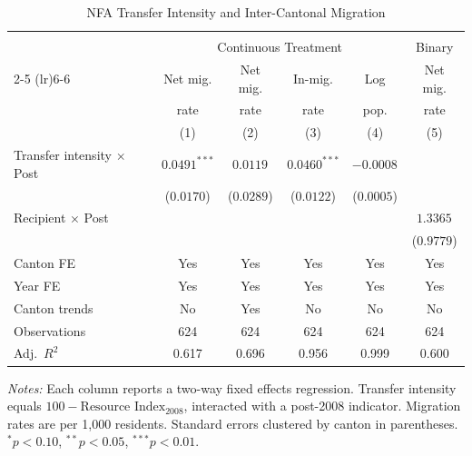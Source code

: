 \begin{table}[t]
\centering
\caption{NFA Transfer Intensity and Inter-Cantonal Migration}
\label{tab:main}
\small
\begin{threeparttable}
\begin{tabular}{lccccc}
\hline\hline
\\[-1.8ex]
 & \multicolumn{4}{c}{Continuous Treatment} & Binary \\
\cmidrule(lr){2-5} \cmidrule(lr){6-6}
 & Net mig. & Net mig. & In-mig. & Log & Net mig. \\
 & rate & rate & rate & pop. & rate \\
 & (1) & (2) & (3) & (4) & (5) \\
\hline
Transfer intensity $\times$ Post & $0.0491^{***}$ & $0.0119^{}$ & $0.0460^{***}$ & $-0.0008^{}$ & \\
 & ($0.0170$) & ($0.0289$) & ($0.0122$) & ($0.0005$) & \\
Recipient $\times$ Post & & & & & $1.3365^{}$ \\
 & & & & & ($0.9779$) \\
\hline
Canton FE & Yes & Yes & Yes & Yes & Yes \\
Year FE & Yes & Yes & Yes & Yes & Yes \\
Canton trends & No & Yes & No & No & No \\
Observations & 624 & 624 & 624 & 624 & 624 \\
Adj.\ $R^2$ & 0.617 & 0.696 & 0.956 & 0.999 & 0.600 \\
\hline\hline
\end{tabular}
\begin{tablenotes}
\item \textit{Notes:} Each column reports a two-way fixed effects regression. Transfer intensity equals $100 - \text{Resource Index}_{2008}$, interacted with a post-2008 indicator. Migration rates are per 1,000 residents. Standard errors clustered by canton in parentheses. $^{*}p<0.10$, $^{**}p<0.05$, $^{***}p<0.01$.
\end{tablenotes}
\end{threeparttable}
\end{table}
